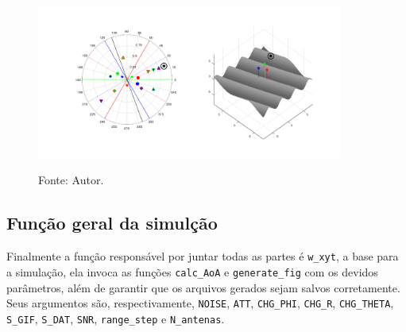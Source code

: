 \begin{figure}[htbp]
	\centering
	\caption{Exemplo de quadro da animação de saída da função \lstinline|generate_fig|.}
	\includegraphics[width=0.9\textwidth]{../pictures/simul_POLY_3_R_50.png}
	\label{fig:example:simul_POLY_3_R_50}
	\caption*{Fonte: Autor.}
\end{figure}

\subsection{Função geral da simulção}


Finalmente a função responsável por juntar todas as partes é \lstinline|w_xyt|, a base para a simulação, ela invoca as funções \lstinline|calc_AoA| e \lstinline|generate_fig| com os devidos parâmetros, além de garantir que os arquivos gerados sejam salvos corretamente.
Seus argumentos são, respectivamente, \lstinline|NOISE|, \lstinline|ATT|, \lstinline|CHG_PHI|, \lstinline|CHG_R|, \lstinline|CHG_THETA|, \lstinline|S_GIF|, \lstinline|S_DAT|, \lstinline|SNR|, \lstinline|range_step| e \lstinline|N_antenas|.



% 	




